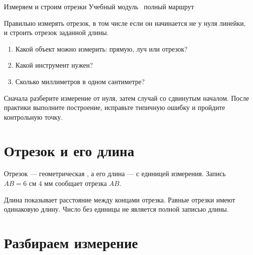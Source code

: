 \worksheettitle
  {Измеряем и строим отрезки}
  { Учебный модуль \textbullet\ полный маршрут}

\studentnameblock

\begin{notebox}
  Правильно измерять отрезок, в том числе если он начинается не у нуля
  линейки, и строить отрезок заданной длины.
\end{notebox}

\begin{checkpointbox}
  \begin{enumerate}[label=\textbf{\arabic*.}]
    \item Какой объект можно измерить: прямую, луч или отрезок?
      \answerblank[32mm]
    \item Какой инструмент нужен? \answerblank[32mm]
    \item Сколько миллиметров в одном сантиметре? \answerblank[22mm]
  \end{enumerate}
\end{checkpointbox}

\begin{notebox}
  Сначала разберите измерение от нуля, затем случай со сдвинутым началом.
  После практики выполните построение, исправьте типичную ошибку и пройдите
  контрольную точку.
\end{notebox}

\section{Отрезок и его длина}

\segmentlengthfigure

\begin{fillbox}
  Отрезок — геометрическая \answerblank[28mm], а его длина —
  \answerblank[24mm] с единицей измерения. Запись
  $AB=6\text{ см }4\text{ мм}$ сообщает \answerblank[48mm] отрезка $AB$.
\end{fillbox}

\begin{notebox}[Правило]
  Длина показывает расстояние между концами отрезка. Равные отрезки имеют
  одинаковую длину. Число без единицы не является полной записью длины.
\end{notebox}

\section{Разбираем измерение}

